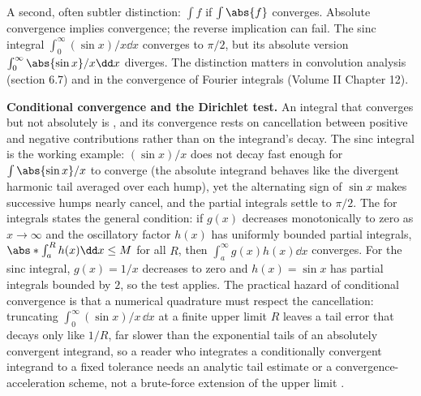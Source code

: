 A second, often subtler distinction: $\int f$  if $\int \abs{f}$ converges. Absolute convergence
implies convergence; the reverse implication can fail. The sinc
integral $\int_{0}^{\infty} (\sin x)/x \dd x$ converges to $\pi/2$,
but its absolute version $\int_{0}^{\infty} \abs{\sin x}/x \dd x$
diverges. The distinction matters in convolution analysis (section
6.7) and in the convergence of Fourier integrals (Volume II
Chapter 12).

\begin{mastery}
\textbf{Conditional convergence and the Dirichlet test.} An integral
that converges but not absolutely is , and its convergence rests on cancellation between
positive and negative contributions rather than on the integrand's
decay. The sinc integral is the working example: $(\sin x)/x$ does not
decay fast enough for $\int\abs{\sin x}/x$ to converge (the absolute
integrand behaves like the divergent harmonic tail averaged over each
hump), yet the alternating sign of $\sin x$ makes successive humps
nearly cancel, and the partial integrals settle to $\pi/2$. The
 for integrals states the general condition:
if $g(x)$ decreases monotonically to zero as $x \to \infty$ and the
oscillatory factor $h(x)$ has uniformly bounded partial integrals,
$\abs*{\int_{a}^{R} h(x)\dd x} \leq M$ for all $R$, then
$\int_{a}^{\infty} g(x)h(x)\dd x$ converges. For the sinc integral,
$g(x) = 1/x$ decreases to zero and $h(x) = \sin x$ has partial
integrals bounded by $2$, so the test applies. The practical hazard
of conditional convergence is that a numerical quadrature must respect
the cancellation: truncating $\int_{0}^{\infty}(\sin x)/x\,\dd x$ at a
finite upper limit $R$ leaves a tail error that decays only like
$1/R$, far slower than the exponential tails of an absolutely
convergent integrand, so a reader who integrates a conditionally
convergent integrand to a fixed tolerance needs an analytic tail
estimate or a convergence-acceleration scheme, not a brute-force
extension of the upper limit \cite{text:v2ch06-apostol-calculus}.
\end{mastery}

